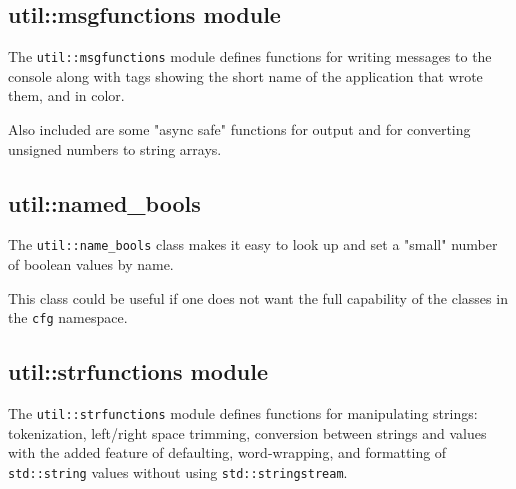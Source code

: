 \subsection{util::msgfunctions module}
\label{subsec:util_namespace_msgfunctions}

   The \texttt{util::msgfunctions} module defines functions for writing
   messages to the console along with tags showing the short name of the
   application that wrote them, and in color.

   Also included are some "async safe" functions for output and for
   converting unsigned numbers to string arrays.

\subsection{util::named\_bools}
\label{subsec:util_namespace_filefunctions}

   The \texttt{util::name\_bools} class
   makes it easy to look up and set a "small" number of
   boolean values by name.

   This class could be useful if one does not want the full capability
   of the classes in the \texttt{cfg} namespace.

\subsection{util::strfunctions module}
\label{subsec:util_namespace_strfunctions}

   The \texttt{util::strfunctions} module defines functions for manipulating
   strings: tokenization, left/right space trimming, conversion between
   strings and values with the added feature of defaulting, word-wrapping,
   and formatting of \texttt{std::string} values without using
   \texttt{std::stringstream}.

